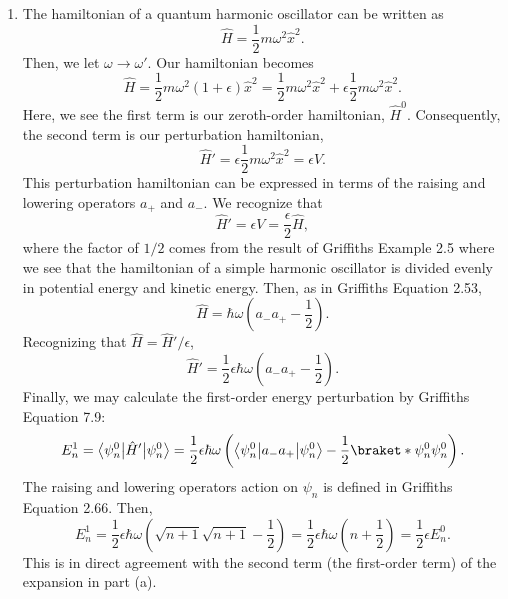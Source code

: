 \documentclass[a4paper, 12pt]{config/homework}
\begin{document}
\begin{enumerate}
\begin{enumerate}[label=(\alph*)]
\pagebreak
\item The hamiltonian of a quantum harmonic oscillator can be written as
\[\hat{H} = \frac{1}{2}m\omega^2 \hat{x}^2.\]
Then, we let \(\omega \to \omega'\). Our hamiltonian becomes
\[\hat{H} = \frac{1}{2}m\omega^2(1+\epsilon)\hat{x}^2 = \frac{1}{2}m\omega^2\hat{x}^2 + \epsilon\frac{1}{2}m\omega^2\hat{x}^2.\]
Here, we see the first term is our zeroth-order hamiltonian, \(\hat{H}^0\). Consequently, the second term is our perturbation hamiltonian,
\[\hat{H}'=\epsilon \frac{1}{2}m\omega^2\hat{x}^2 = \epsilon V.\]
This perturbation hamiltonian can be expressed in terms of the raising and lowering operators \(a_+\) and \(a_-\). We recognize that
\[\hat{H}' = \epsilon V = \frac{\epsilon}{2} \hat{H},\]
where the factor of \(1/2\) comes from the result of Griffiths Example 2.5 where we see that the hamiltonian of a simple harmonic oscillator is divided evenly in potential energy and kinetic energy.
Then, as in Griffiths Equation 2.53,
\[\hat{H} = \hbar\omega\left(a_-a_+ - \frac{1}{2}\right).\]
Recognizing that \(\hat{H} = \hat{H}'/\epsilon\),
\[\hat{H}' = \frac{1}{2}\epsilon\hbar\omega\left(a_-a_+-\frac{1}{2}\right).\]
Finally, we may calculate the first-order energy perturbation by Griffiths Equation 7.9:
\[E_n^1 = \bra*{\psi_n^0}\hat{H}'\ket*{\psi_n^0} = \frac{1}{2}\epsilon\hbar\omega\left(\bra*{\psi_n^0}a_-a_+\ket*{\psi_n^0} - \frac{1}{2}\braket*{\psi_n^0}{\psi_n^0}\right).\]
The raising and lowering operators action on \(\psi_n\) is defined in Griffiths Equation 2.66. Then,
\[E_n^1 = \frac{1}{2}\epsilon\hbar\omega\left(\sqrt{n+1}\sqrt{n+1} - \frac{1}{2}\right) = \frac{1}{2}\epsilon\hbar\omega\left(n + \frac{1}{2}\right) = \frac{1}{2}\epsilon E_n^0.\]
This is in direct agreement with the second term (the first-order term) of the expansion in part (a).
\end{enumerate}
\end{enumerate}
\end{document}

